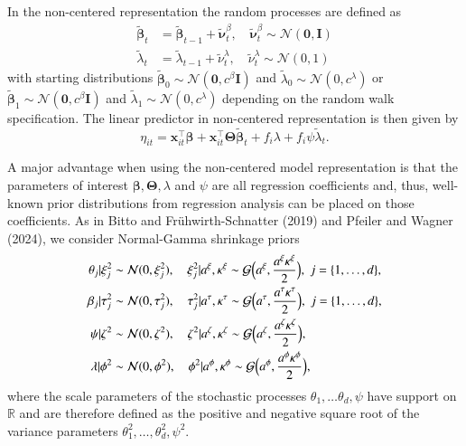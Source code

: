 \documentclass[a4paper, preprint, 3p,
authoryear]{elsarticle} %
\begin{document}
In the non-centered representation the random processes are defined as
\begin{equation*}
\begin{aligned}
    \tilde{\boldsymbol{\beta}}_t &= \tilde{\boldsymbol{\beta}}_{t-1} + \tilde{\boldsymbol{\nu}}^\beta_t, \quad \tilde{\boldsymbol{\nu}}^\beta_t \sim \mathcal{N}(\textbf{0}, \textbf{I}) \\
    \tilde{\lambda}_t &= \tilde{\lambda}_{t-1} + \tilde{\nu}^\lambda_t, \quad \tilde{\nu}^\lambda_t \sim \mathcal{N}(0,1)
\end{aligned}
\end{equation*} with starting distributions
\(\tilde{\boldsymbol{\beta}}_0 \sim \mathcal{N}(\textbf{0},c^\beta \textbf{I})\)
and \(\tilde{\lambda}_0 \sim \mathcal{N}(0,c^\lambda)\) or
\(\tilde{\boldsymbol{\beta}}_1 \sim \mathcal{N}(\textbf{0},c^\beta \textbf{I})\)
and \(\tilde{\lambda}_1 \sim \mathcal{N}(0,c^\lambda)\) depending on the
random walk specification. The linear predictor in non-centered
representation is then given by \begin{equation}
\label{non-centered}
    \eta_{it} = \textbf{x}_{it}^\top \boldsymbol{\beta} + \textbf{x}_{it}^\top \boldsymbol{\Theta} \tilde{\boldsymbol{\beta}}_t + f_i\lambda + f_i \psi \tilde{\lambda}_t.
\end{equation}

A major advantage when using the non-centered model representation is
that the parameters of interest
\(\boldsymbol{\beta}, \boldsymbol{\Theta}, \lambda\) and \(\psi\) are
all regression coefficients and, thus, well-known prior distributions
from regression analysis can be placed on those coefficients. As in
Bitto and Frühwirth-Schnatter (2019) and Pfeiler and Wagner (2024), we
consider Normal-Gamma shrinkage priors \begin{equation*}
\begin{aligned}
        \theta_j|\xi_j^2 &\sim \mathcal{N}(0,\xi^2_j), \quad \xi_j^2|a^\xi, \kappa^\xi \sim \mathcal{G}\Bigl(a^\xi, \frac{a^\xi \kappa^\xi}{2}\Bigr), \; j=\{1,\dots,d\}, \\
        \beta_j|\tau_j^2 &\sim \mathcal{N}(0,\tau_j^2), \quad \tau_j^2|a^\tau, \kappa^\tau \sim \mathcal{G}\Bigl(a^\tau, \frac{a^\tau \kappa^\tau}{2}\Bigr),  \; j=\{1,\dots,d\}, \\
        \psi|\zeta^2 &\sim \mathcal{N}(0,\zeta^2), \quad \zeta^2|a^\zeta, \kappa^\zeta \sim \mathcal{G}\Bigl(a^\zeta, \frac{a^\zeta \kappa^\zeta}{2}\Bigr), \\
        \lambda|\phi^2 &\sim \mathcal{N}(0,\phi^2), \quad \phi^2|a^\phi, \kappa^\phi \sim \mathcal{G}\Bigl(a^\phi, \frac{a^\phi \kappa^\phi}{2}\Bigr),
\end{aligned}
\end{equation*} where the scale parameters of the stochastic processes
\(\theta_1,\dots\theta_d,\psi\) have support on \(\mathbb{R}\) and are
therefore defined as the positive and negative square root of the
variance parameters \(\theta^2_1,\dots,\theta^2_d,\psi^2.\)
\end{document}
